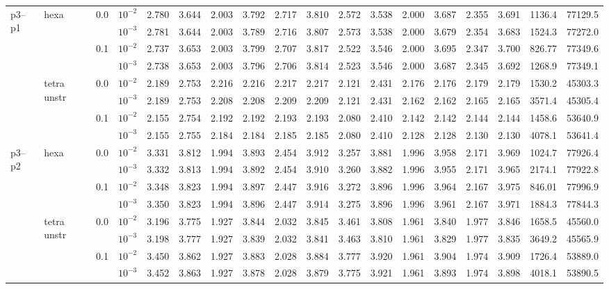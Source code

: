 \begin{longtable}{llclrrrrrrrrrrrrrr}
\multirow{8}{*}{p3--p1} & \multirow{4}{*}{hexa} & \multirow{2}{*}{0.0} & $10^{-2}$ & 2.780 & 3.644 & 2.003 & 3.792 & 2.717 & 3.810 & 2.572 & 3.538 & 2.000 & 3.687 & 2.355 & 3.691 & 1136.4 & 77129.5 \\
& & & $10^{-3}$ & 2.781 & 3.644 & 2.003 & 3.789 & 2.716 & 3.807 & 2.573 & 3.538 & 2.000 & 3.679 & 2.354 & 3.683 & 1524.3 & 77272.0 \\\cline{3-18}
& & \multirow{2}{*}{0.1} & $10^{-2}$ & 2.737 & 3.653 & 2.003 & 3.799 & 2.707 & 3.817 & 2.522 & 3.546 & 2.000 & 3.695 & 2.347 & 3.700 & 826.77 & 77349.6 \\
& & & $10^{-3}$ & 2.738 & 3.653 & 2.003 & 3.796 & 2.706 & 3.814 & 2.523 & 3.546 & 2.000 & 3.687 & 2.345 & 3.692 & 1268.9 & 77349.1 \\\cline{2-18}
& \multirow{4}{*}{tetra unstr} & \multirow{2}{*}{0.0} & $10^{-2}$ & 2.189 & 2.753 & 2.216 & 2.216 & 2.217 & 2.217 & 2.121 & 2.431 & 2.176 & 2.176 & 2.179 & 2.179 & 1530.2 & 45303.3 \\
& & & $10^{-3}$ & 2.189 & 2.753 & 2.208 & 2.208 & 2.209 & 2.209 & 2.121 & 2.431 & 2.162 & 2.162 & 2.165 & 2.165 & 3571.4 & 45305.4 \\\cline{3-18}
& & \multirow{2}{*}{0.1} & $10^{-2}$ & 2.155 & 2.754 & 2.192 & 2.192 & 2.193 & 2.193 & 2.080 & 2.410 & 2.142 & 2.142 & 2.144 & 2.144 & 1458.6 & 53640.9 \\
& & & $10^{-3}$ & 2.155 & 2.755 & 2.184 & 2.184 & 2.185 & 2.185 & 2.080 & 2.410 & 2.128 & 2.128 & 2.130 & 2.130 & 4078.1 & 53641.4 \\\hline

\multirow{8}{*}{p3--p2} & \multirow{4}{*}{hexa} & \multirow{2}{*}{0.0} & $10^{-2}$ & 3.331 & 3.812 & 1.994 & 3.893 & 2.454 & 3.912 & 3.257 & 3.881 & 1.996 & 3.958 & 2.171 & 3.969 & 1024.7 & 77926.4 \\
& & & $10^{-3}$ & 3.332 & 3.813 & 1.994 & 3.892 & 2.454 & 3.910 & 3.260 & 3.882 & 1.996 & 3.955 & 2.171 & 3.965 & 2174.1 & 77922.8 \\\cline{3-18}
& & \multirow{2}{*}{0.1} & $10^{-2}$ & 3.348 & 3.823 & 1.994 & 3.897 & 2.447 & 3.916 & 3.272 & 3.896 & 1.996 & 3.964 & 2.167 & 3.975 & 846.01 & 77996.9 \\
& & & $10^{-3}$ & 3.350 & 3.823 & 1.994 & 3.896 & 2.447 & 3.914 & 3.275 & 3.896 & 1.996 & 3.961 & 2.167 & 3.971 & 1884.3 & 77844.3 \\\cline{2-18}
& \multirow{4}{*}{tetra unstr} & \multirow{2}{*}{0.0} & $10^{-2}$ & 3.196 & 3.775 & 1.927 & 3.844 & 2.032 & 3.845 & 3.461 & 3.808 & 1.961 & 3.840 & 1.977 & 3.846 & 1658.5 & 45560.0 \\
& & & $10^{-3}$ & 3.198 & 3.777 & 1.927 & 3.839 & 2.032 & 3.841 & 3.463 & 3.810 & 1.961 & 3.829 & 1.977 & 3.835 & 3649.2 & 45565.9 \\\cline{3-18}
& & \multirow{2}{*}{0.1} & $10^{-2}$ & 3.450 & 3.862 & 1.927 & 3.883 & 2.028 & 3.884 & 3.777 & 3.920 & 1.961 & 3.904 & 1.974 & 3.909 & 1726.4 & 53889.0 \\
& & & $10^{-3}$ & 3.452 & 3.863 & 1.927 & 3.878 & 2.028 & 3.879 & 3.775 & 3.921 & 1.961 & 3.893 & 1.974 & 3.898 & 4018.1 & 53890.5 \\\hline


\end{longtable}
